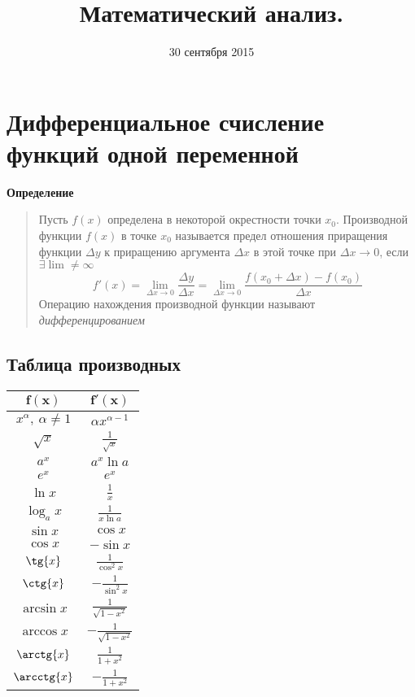 \documentclass[11pt]{article}
\title{Математический анализ.}
\date{30 сентября 2015}
\begin{document}
\pagestyle{empty}
\maketitle

\section{Дифференциальное счисление функций одной переменной}

	\textbf{Определение}
	\begin{quote}
		Пусть $f(x)$ определена в некоторой окрестности точки $x_0$. Производной функции $f(x)$ в точке $x_0$ называется предел отношения приращения функции $\Delta y$ к приращению аргумента $\Delta x$ в этой точке при $\Delta x \rightarrow 0$, если $\exists\lim\neq\infty$
		\[f'(x)=\lim_{\Delta x \rightarrow 0} \frac{\Delta y}{\Delta x}=\lim_{\Delta x \rightarrow 0}\frac{f(x_0+\Delta x)-f(x_0)}{\Delta x}\]
		Операцию нахождения производной функции называют \emph{дифференцированием}
	\end{quote}

\subsection{Таблица производных}
\begin{center}
\begin{tabular}{|c|c|}
\hline
	$\mathbf{f(x)}$ & $\mathbf{f'(x)}$\\
    \hline
	$x^\alpha,\ \alpha\neq 1$ & $\alpha x^{\alpha-1}$\\
	$\sqrt{x}$ & $\displaystyle\frac{1}{\sqrt{x}}$\\[1.5ex]
	$a^x$ & $a^x\ln{a}$\\
	$e^x$ & $e^x$\\
	$\ln{x}$ & $\displaystyle\frac{1}{x}$\\[1.5ex]
	$\log_a{x}$ & $\displaystyle\frac{1}{x\ln a}$\\[1.5ex]
    \hline
	$\sin{x}$ & $\cos{x}$\\
	$\cos{x}$ & $-\sin{x}$\\[1.5ex]
	$\tg{x}$ & $\displaystyle\frac{1}{\cos^2{x}}$\\[2ex]
	$\ctg{x}$ & $\displaystyle-\frac{1}{\sin^2{x}}$\\[2ex]
	$\arcsin{x}$ & $\displaystyle\frac{1}{\sqrt{1-x^2}}$\\[2ex]
	$\arccos{x}$ & $\displaystyle-\frac{1}{\sqrt{1-x^2}}$\\[2ex]
	$\arctg{x}$ & $\displaystyle\frac{1}{1+x^2}$\\[2ex]
	$\arcctg{x}$ & $\displaystyle-\frac{1}{1+x^2}$\\[2ex]
\hline
\end{tabular}
\end{center}
\end{document}
